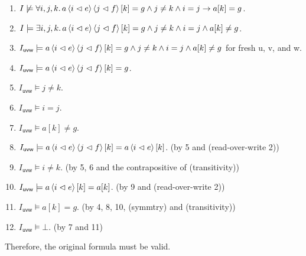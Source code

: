 \begin{exer}[3.4]
\begin{enumerate}[label=(\alph*)]
\begin{enumerate}[label=\arabic*.]
                \item %
                    $I \not\models \forall i, j, k.\, a\ev{i \vartriangleleft e}\ev{j \vartriangleleft f}[k] = g \land j \ne k \land i = j \rightarrow a[k] = g$.
                \item %
                    $I \models \exists i, j, k.\, a\ev{i \vartriangleleft e}\ev{j \vartriangleleft f}[k] = g \land j \ne k \land i = j \land a[k] \ne g$.
                \item %
                    $I_{\textsf{uvw}} \models a\ev{i \vartriangleleft e}\ev{j \vartriangleleft f}[k] = g \land j \ne k \land i = j \land a[k] \ne g$ for fresh \textsf{u}, \textsf{v}, and \textsf{w}.
                \item %
                    $I_{\textsf{uvw}} \models a\ev{i \vartriangleleft e}\ev{j \vartriangleleft f}[k] = g$.
                \item %
                    $I_{\textsf{uvw}} \models j \ne k$.
                \item %
                    $I_{\textsf{uvw}} \models i = j$.
                \item %
                    $I_{\textsf{uvw}} \models a[k] \ne g$.
                \item %
                    $I_{\textsf{uvw}} \models a\ev{i \vartriangleleft e}\ev{j \vartriangleleft f}[k] = a\ev{i \vartriangleleft e}[k]$. (by 5 and \textsf{(read-over-write 2)})
                \item %
                    $I_{\textsf{uvw}} \models i \ne k$. (by 5, 6 and the contrapositive of \textsf{(transitivity)})
                \item %
                    $I_{\textsf{uvw}} \models a\ev{i \vartriangleleft e}[k] = a[k]$. (by 9 and \textsf{(read-over-write 2)})
                \item %
                    $I_{\textsf{uvw}} \models a[k] = g$. (by 4, 8, 10, \textsf{(symmtry)} and \textsf{(transitivity)})
                \item %
                    $I_{\textsf{uvw}} \models \bot$. (by 7 and 11)
            \end{enumerate}
            Therefore, the original formula must be valid.
    \end{enumerate}
\end{exer}
